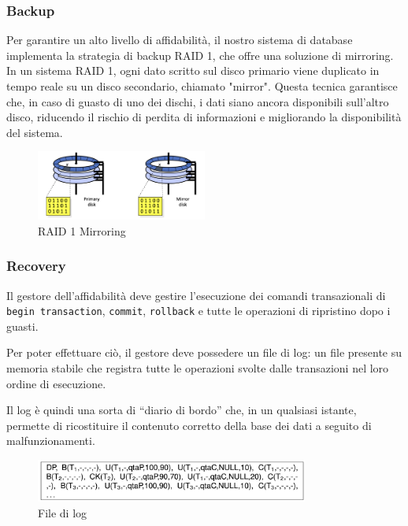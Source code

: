 \subsubsection{Backup}

Per garantire un alto livello di affidabilità, il nostro sistema di database implementa la strategia di backup RAID 1, che offre una soluzione di mirroring. In un sistema RAID 1, ogni dato scritto sul disco primario viene duplicato in tempo reale su un disco secondario, chiamato "mirror". Questa tecnica garantisce che, in caso di guasto di uno dei dischi, i dati siano ancora disponibili sull'altro disco, riducendo il rischio di perdita di informazioni e migliorando la disponibilità del sistema.

\begin{figure}[h]
    \centering
    \includegraphics[width=0.5\textwidth]{Media/raid.png}
    \caption{RAID 1 Mirroring}
    \label{fig:raid}
\end{figure}

\subsubsection{Recovery}

Il gestore dell’affidabilità deve gestire l’esecuzione dei comandi transazionali di \texttt{begin transaction}, \texttt{commit}, \texttt{rollback} e tutte le operazioni di ripristino dopo i guasti.

Per poter effettuare ciò, il gestore deve possedere un file di log: un file presente su memoria stabile che registra tutte le operazioni svolte dalle transazioni nel loro ordine di esecuzione.

Il log è quindi una sorta di “diario di bordo” che, in un qualsiasi istante, permette di ricostituire il contenuto corretto della base dei dati a seguito di malfunzionamenti.

\begin{figure}[h]
    \centering
    \includegraphics[width=0.8\textwidth]{Media/log.png}
    \caption{File di log}
    \label{fig:log}
\end{figure}

